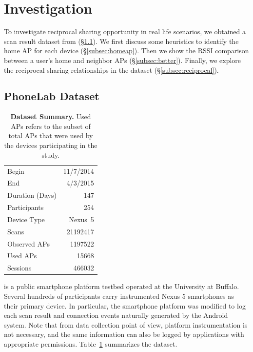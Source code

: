 \section{Investigation}
\label{sec:investigation}

To investigate reciprocal sharing opportunity in real life scenarios, we
obtained a \wifi{} scan result dataset from \PhoneLab{}
(\S\ref{subsec:phonelab}). We first discuss some heuristics to identify the home
AP for each device (\S\ref{subsec:homeap}). Then we show the RSSI comparison
between a user's home and neighbor APs (\S\ref{subsec:better}). Finally, we
explore the reciprocal sharing relationships in the dataset
(\S\ref{subsec:reciprocal}).

\subsection{PhoneLab \wifi{} Dataset}
\label{subsec:phonelab}

\begin{table}[t]
  \begin{tabularx}{\columnwidth}{Xr}
    \toprule
    Begin & 11/7/2014 \\ 
    End & 4/3/2015 \\ 
    Duration (Days) & 147 \\ \midrule
    Participants & 254 \\
    Device Type & Nexus~5 \\ \midrule
    Scans & \num{21192417} \\
    Observed APs & \num{1197522} \\
    Used APs & \num{15668} \\ \midrule
    \wifi{} Sessions & \num{466032} \\
    \bottomrule
  \end{tabularx}
  \caption{\textbf{\PhoneLab{} \wifi{} Dataset Summary.} Used APs refers to the
  subset of total APs that were used by the devices participating in the study.}
  \label{tab:summary}
\end{table}

\PhoneLab{}\cite{phonelab-sensemine13} is a public smartphone platform testbed
operated at the University at Buffalo. Several hundreds of participants carry
instrumented Nexus 5 smartphones as their primary device. In particular, the
smartphone platform was modified to log each \wifi{} scan result and \wifi{}
connection events naturally generated by the Android system. Note that from data
collection point of view, platform instrumentation is not necessary, and the
same information can also be logged by applications with appropriate
permissions. Table~\ref{tab:summary} summarizes the \PhoneLab{} \wifi{} dataset.

